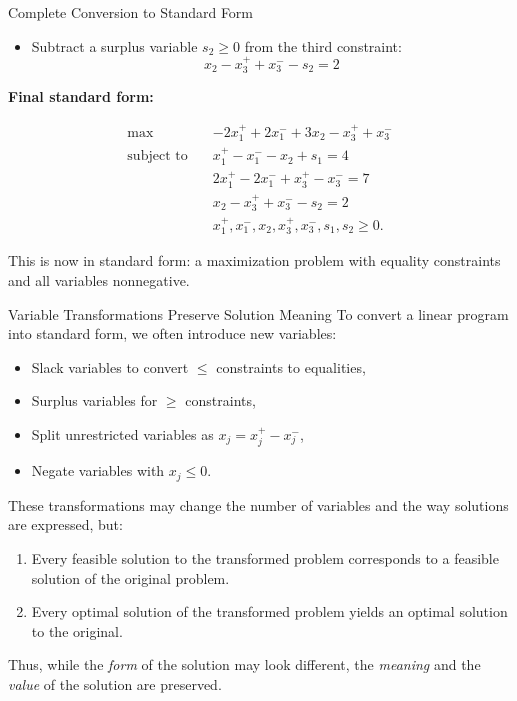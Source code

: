 \begin{example}{Complete Conversion to Standard Form}{}
\begin{itemize}
    \item Subtract a surplus variable \( s_2 \geq 0 \) from the third constraint:
    \[
    x_2 - x_3^+ + x_3^- - s_2 = 2
    \]
\end{itemize}

\medskip
\textbf{Final standard form:}

\[
\begin{aligned}
\max \quad & -2x_1^+ + 2x_1^- + 3x_2 - x_3^+ + x_3^- \\
\text{subject to} \quad 
& x_1^+ - x_1^- - x_2 + s_1 = 4 \\
& 2x_1^+ - 2x_1^- + x_3^+ - x_3^- = 7 \\
& x_2 - x_3^+ + x_3^- - s_2 = 2 \\
& x_1^+, x_1^-, x_2, x_3^+, x_3^-, s_1, s_2 \geq 0.
\end{aligned}
\]

This is now in standard form: a maximization problem with equality constraints and all variables nonnegative.
\end{example}

\begin{remark}{Variable Transformations Preserve Solution Meaning}{}
To convert a linear program into standard form, we often introduce new variables:
\begin{itemize}
    \item Slack variables to convert \( \leq \) constraints to equalities,
    \item Surplus variables for \( \geq \) constraints,
    \item Split unrestricted variables as \( x_j = x_j^+ - x_j^- \),
    \item Negate variables with \( x_j \leq 0 \).
\end{itemize}

These transformations may change the number of variables and the way solutions are expressed, but:
\begin{enumerate}
    \item Every feasible solution to the transformed problem corresponds to a feasible solution of the original problem.
    \item Every optimal solution of the transformed problem yields an optimal solution to the original.
\end{enumerate}

Thus, while the \emph{form} of the solution may look different, the \emph{meaning} and the \emph{value} of the solution are preserved.
\end{remark}

